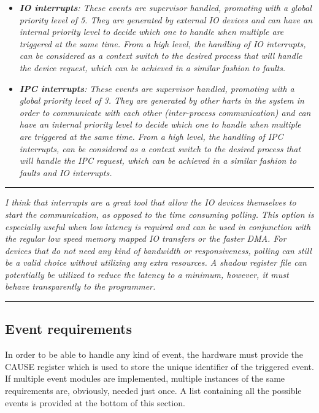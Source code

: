         \begin{itemize}

            \item \textit{\textbf{IO interrupts}: These events are supervisor handled, promoting with a global priority level of 5. They are generated by external IO devices and can have an internal priority level to decide which one to handle when multiple are triggered at the same time. From a high level, the handling of IO interrupts, can be considered as a context switch to the desired process that will handle the device request, which can be achieved in a similar fashion to faults.}

            \item \textit{\textbf{IPC interrupts}: These events are supervisor handled, promoting with a global priority level of 3. They are generated by other harts in the system in order to communicate with each other (inter-process communication) and can have an internal priority level to decide which one to handle when multiple are triggered at the same time. From a high level, the handling of IPC interrupts, can be considered as a context switch to the desired process that will handle the IPC request, which can be achieved in a similar fashion to faults and IO interrupts.}

        \end{itemize}

    \par\noindent\rule{\textwidth}{0.4pt}
    \textit{I think that interrupts are a great tool that allow the IO devices themselves to start the communication, as opposed to the time consuming polling. This option is especially useful when low latency is required and can be used in conjunction with the regular low speed memory mapped IO transfers or the faster DMA. For devices that do not need any kind of bandwidth or responsiveness, polling can still be a valid choice without utilizing any extra resources. A shadow register file can potentially be utilized to reduce the latency to a minimum, however, it must behave transparently to the programmer.}
    \par\noindent\rule{\textwidth}{0.4pt}

    \subsection{Event requirements}

        In order to be able to handle any kind of event, the hardware must provide the CAUSE register which is used to store the unique identifier of the triggered event. If multiple event modules are implemented, multiple instances of the same requirements are, obviously, needed just once. A list containing all the possible events is provided at the bottom of this section.

